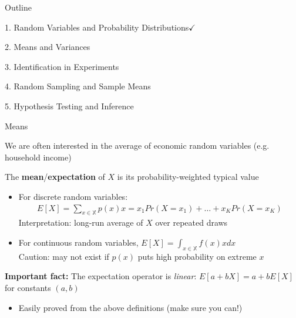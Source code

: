 \documentclass[11pt,english,handout]{beamer}
\newenvironment{wideitemize}{\itemize\addtolength{\itemsep}{10pt}}{\enditemize}
\begin{document}
\begin{frame}{Outline}
	
	\textcolor{red!75!green!50!blue!25!gray}{1. Random Variables and Probability Distributions}$\checkmark$
	\vspace{0.8cm}
	
	2. Means and Variances 
	\vspace{0.8cm}
	
	\textcolor{red!75!green!50!blue!25!gray}{3. Identification in Experiments}
	\vspace{0.8cm}
	
	\textcolor{red!75!green!50!blue!25!gray}{4. Random Sampling and Sample Means}
	
	\vspace{0.8cm}
	\textcolor{red!75!green!50!blue!25!gray}{5. Hypothesis Testing and Inference}
	
\end{frame}

\begin{frame}{Means}

\begin{wideitemize}

\item
We are often interested in the average of economic random variables (e.g. household income)

\item\pause{}
The \textbf{mean}/\textbf{expectation} of $X$ is its probability-weighted typical value


\begin{itemize}
\item For discrete random variables:
\vspace{-0.1cm}
\begin{align*}
E[X]=\sum_{x\in\mathbb{X}}p(x)x=x_1Pr(X=x_1)+\dots + x_KPr(X=x_K)
\end{align*}\pause{}
\vspace{-0.2cm}
Interpretation: long-run average of $X$ over repeated draws\pause{}

\vspace{0.5cm}
\item For continuous random variables, $E[X]=\int_{x\in\mathbb{X}}f(x)xdx$\pause \\ Caution: may not exist if $p(x)$ puts high probability on extreme $x$
\end{itemize}
\vspace{0.1cm}\pause

\item \textbf{Important fact:} The expectation operator is \emph{linear}: $E[a+bX]=a+bE[X]$ for  constants $(a,b)$
\vspace{0.1cm}

\begin{itemize}
\item Easily proved from the above definitions (make sure you can!)
\end{itemize}
\end{wideitemize}

\end{frame}
\end{document}
